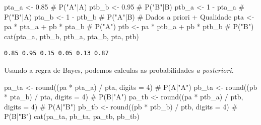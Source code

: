 \documentclass[
  letterpaper,
  DIV=11,
  numbers=noendperiod]{scrartcl}
\newenvironment{Shaded}{\begin{snugshade}}{\end{snugshade}}
\newcommand{\AttributeTok}[1]{\textcolor[rgb]{0.40,0.45,0.13}{#1}}
\newcommand{\CommentTok}[1]{\textcolor[rgb]{0.37,0.37,0.37}{#1}}
\newcommand{\DecValTok}[1]{\textcolor[rgb]{0.68,0.00,0.00}{#1}}
\newcommand{\FloatTok}[1]{\textcolor[rgb]{0.68,0.00,0.00}{#1}}
\newcommand{\FunctionTok}[1]{\textcolor[rgb]{0.28,0.35,0.67}{#1}}
\newcommand{\NormalTok}[1]{\textcolor[rgb]{0.00,0.23,0.31}{#1}}
\newcommand{\OtherTok}[1]{\textcolor[rgb]{0.00,0.23,0.31}{#1}}
\newcommand{\SpecialCharTok}[1]{\textcolor[rgb]{0.37,0.37,0.37}{#1}}
\begin{document}
\begin{Shaded}
\begin{Highlighting}[]
\NormalTok{pta\_a }\OtherTok{\textless{}{-}} \FloatTok{0.85}         \CommentTok{\# P("A"|A)}
\NormalTok{ptb\_b }\OtherTok{\textless{}{-}} \FloatTok{0.95}         \CommentTok{\# P("B"|B)}
\NormalTok{ptb\_a }\OtherTok{\textless{}{-}} \DecValTok{1} \SpecialCharTok{{-}}\NormalTok{ pta\_a    }\CommentTok{\# P("B"|A)}
\NormalTok{pta\_b }\OtherTok{\textless{}{-}} \DecValTok{1} \SpecialCharTok{{-}}\NormalTok{ ptb\_b    }\CommentTok{\# P("A"|B)}
\CommentTok{\# Dados \textquotesingle{}a priori\textquotesingle{} + Qualidade}
\NormalTok{pta }\OtherTok{\textless{}{-}}\NormalTok{ pa }\SpecialCharTok{*}\NormalTok{ pta\_a }\SpecialCharTok{+}\NormalTok{ pb }\SpecialCharTok{*}\NormalTok{ pta\_b  }\CommentTok{\# P("A")}
\NormalTok{ptb }\OtherTok{\textless{}{-}}\NormalTok{ pa }\SpecialCharTok{*}\NormalTok{ ptb\_a }\SpecialCharTok{+}\NormalTok{ pb }\SpecialCharTok{*}\NormalTok{ ptb\_b  }\CommentTok{\# P("B")}
\FunctionTok{cat}\NormalTok{(pta\_a, ptb\_b, ptb\_a, pta\_b, pta, ptb)}
\end{Highlighting}
\end{Shaded}

\begin{verbatim}
0.85 0.95 0.15 0.05 0.13 0.87
\end{verbatim}

Usando a regra de Bayes, podemos calculas as probabilidades \emph{a
posteriori.}

\begin{Shaded}
\begin{Highlighting}[]
\NormalTok{pa\_ta }\OtherTok{\textless{}{-}} \FunctionTok{round}\NormalTok{((pa }\SpecialCharTok{*}\NormalTok{ pta\_a) }\SpecialCharTok{/}\NormalTok{ pta, }\AttributeTok{digits =} \DecValTok{4}\NormalTok{)   }\CommentTok{\# P(A|"A")}
\NormalTok{pb\_ta }\OtherTok{\textless{}{-}} \FunctionTok{round}\NormalTok{((pb }\SpecialCharTok{*}\NormalTok{ pta\_b) }\SpecialCharTok{/}\NormalTok{ pta, }\AttributeTok{digits =} \DecValTok{4}\NormalTok{)   }\CommentTok{\# P(B|"A")}
\NormalTok{pa\_tb }\OtherTok{\textless{}{-}} \FunctionTok{round}\NormalTok{((pa }\SpecialCharTok{*}\NormalTok{ ptb\_a) }\SpecialCharTok{/}\NormalTok{ ptb, }\AttributeTok{digits =} \DecValTok{4}\NormalTok{)   }\CommentTok{\# P(A|"B")}
\NormalTok{pb\_tb }\OtherTok{\textless{}{-}} \FunctionTok{round}\NormalTok{((pb }\SpecialCharTok{*}\NormalTok{ ptb\_b) }\SpecialCharTok{/}\NormalTok{ ptb, }\AttributeTok{digits =} \DecValTok{4}\NormalTok{)   }\CommentTok{\# P(B|"B")}
\FunctionTok{cat}\NormalTok{(pa\_ta, pb\_ta, pa\_tb, pb\_tb)}
\end{Highlighting}
\end{Shaded}
\end{document}
